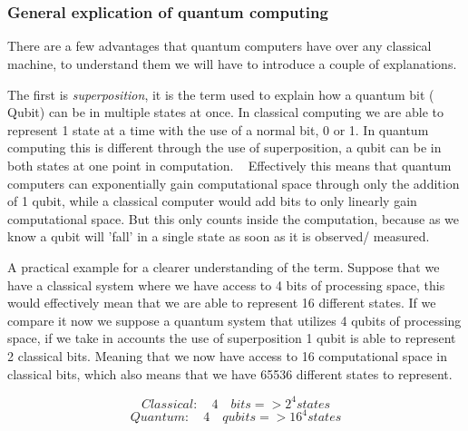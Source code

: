 \chapter{}
\label{ch:quantum-essentials}



\subsection{General explication of quantum computing}

There are a few advantages that quantum computers have over any classical machine, to understand them we will have to introduce a couple of explanations.

The first is \emph{superposition}, it is the term used to explain how a quantum bit ( Qubit) can be in multiple states at once. In classical computing we are able to represent 1 state at a time with the use of a normal bit, 0 or 1. In quantum computing this is different through the use of superposition, a qubit can be in both states at one point in computation. ~\autocite{Shor2000} Effectively this means that quantum computers can exponentially gain computational space through only the addition of 1 qubit, while a classical computer would add bits to only linearly gain computational space. But this only counts inside the computation, because as we know a qubit will 'fall' in a single state as soon as it is observed/ measured. \autocite{Rieffel1998}

A practical example for a clearer understanding of the term. Suppose that we have a classical system where we have access to 4 bits of processing space, this would effectively mean that we are able to represent 16 different states. If we compare it now we suppose a quantum system that utilizes 4 qubits of processing space, if we take in accounts the use of superposition 1 qubit is able to represent 2 classical bits. Meaning that we now have access to 16 computational space in classical bits, which also means that we have 65536 different states to represent. 

\begin{equation}
Classical:\quad 4 \quad bits => 2^{4} states
\end{equation}
\begin{equation}
Quantum: \quad 4 \quad qubits => 16^{4} states
\end{equation}

